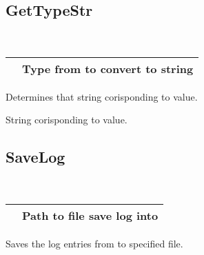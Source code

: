 \documentclass[letterpaper,10pt,english]{sphinxmanual}
\begin{document}
\subsection{GetTypeStr}
\label{\detokenize{log:gettypestr}}

\begin{fulllineitems}
\label{\detokenize{log:_CPPv2N6pessum10GetTypeStrEi}}%
\pysigstartmultiline
{}%
\pysigstopmultiline~

\begin{savenotes}\sphinxattablestart
\centering
\begin{tabulary}{\linewidth}[t]{|T|T|}
\hline

&
Type from {\hyperref[\detokenize{log:_CPPv2N6pessum7LogTypeE}]{}} to convert to string
\\
\hline
\end{tabulary}
\par
\sphinxattableend\end{savenotes}

Determines that string corisponding to  value.

 String corisponding to  value.

\end{fulllineitems}



\subsection{SaveLog}
\label{\detokenize{log:savelog}}

\begin{fulllineitems}
\label{\detokenize{log:_CPPv2N6pessum7SaveLogENSt6stringE}}%
\pysigstartmultiline
{}%
\pysigstopmultiline~

\begin{savenotes}\sphinxattablestart
\centering
\begin{tabulary}{\linewidth}[t]{|T|T|}
\hline

&
Path to file save log into
\\
\hline
\end{tabulary}
\par
\sphinxattableend\end{savenotes}

Saves the log entries from {\hyperref[\detokenize{log:_CPPv2N6pessum11global_logsE}]{}} to specified file.

\end{fulllineitems}
\end{document}
